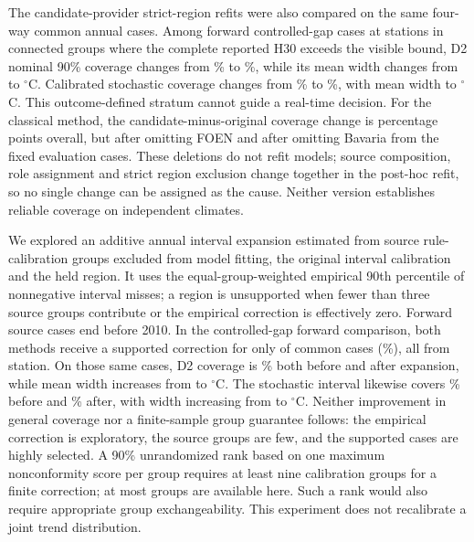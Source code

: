 \documentclass[draft,linenumbers]{agujournal2025}
\begin{document}
The candidate-provider strict-region refits were also compared on the same four-way common annual cases. Among \OpenAnnualCases{} forward controlled-gap cases at \OpenAnnualStations{} stations in \OpenAnnualGroups{} connected groups where the complete reported H30 exceeds the visible bound, D2 nominal 90\% coverage changes from \OpenAnnualDTwoOld\% to \OpenAnnualDTwoNew\%, while its mean width changes from \OpenAnnualDTwoWidthOld{} to \OpenAnnualDTwoWidthNew{}$^{\circ}$C. Calibrated stochastic coverage changes from \OpenAnnualClassicOld\% to \OpenAnnualClassicNew\%, with mean width \OpenAnnualClassicWidthOld{} to \OpenAnnualClassicWidthNew{}$^{\circ}$C. This outcome-defined stratum cannot guide a real-time decision. For the classical method, the candidate-minus-original coverage change is \OpenAnnualClassicDelta{} percentage points overall, but \OpenAnnualClassicDropFoen{} after omitting FOEN and \OpenAnnualClassicDropBayern{} after omitting Bavaria from the fixed evaluation cases. These deletions do not refit models; source composition, role assignment and strict region exclusion change together in the post-hoc refit, so no single change can be assigned as the cause. Neither version establishes reliable coverage on independent climates.

We explored an additive annual interval expansion estimated from source rule-calibration groups excluded from model fitting, the original interval calibration and the held region. It uses the equal-group-weighted empirical 90th percentile of nonnegative interval misses; a region is unsupported when fewer than three source groups contribute or the empirical correction is effectively zero. Forward source cases end before 2010. In the controlled-gap forward comparison, both methods receive a supported correction for only \AEFwdSupported{} of \AEFwdCommon{} common cases (\AEFwdPct\%), all from \AEFwdStations{} station. On those same cases, D2 coverage is \AEFwdDTwoBefore\% both before and after expansion, while mean width increases from \AEFwdDTwoWidthBefore{} to \AEFwdDTwoWidthAfter{}$^{\circ}$C. The stochastic interval likewise covers \AEFwdClassicBefore\% before and \AEFwdClassicAfter\% after, with width increasing from \AEFwdClassicWidthBefore{} to \AEFwdClassicWidthAfter{}$^{\circ}$C. Neither improvement in general coverage nor a finite-sample group guarantee follows: the empirical correction is exploratory, the source groups are few, and the supported cases are highly selected. A 90\% unrandomized rank based on one maximum nonconformity score per group requires at least nine calibration groups for a finite correction; at most \AEMaxSourceGroups{} groups are available here. Such a rank would also require appropriate group exchangeability. This experiment does not recalibrate a joint trend distribution.
\end{document}
